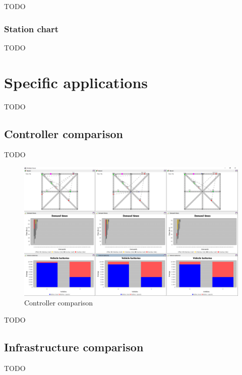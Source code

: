 \documentclass[10pt,twocolumn]{article}
\begin{document}
TODO

\subsubsection{Station chart}

TODO

\section{Specific applications}
\label{sec:application}

TODO

\subsection{Controller comparison}
\label{sec:controller-comparison}

TODO

\begin{figure}[tbp]
    \includegraphics[width=\textwidth]{../../screenshots/controller-comparison.png}
    \caption{Controller comparison}
    \label{fig:controller-comparison}
\end{figure}

TODO

\subsection{Infrastructure comparison}
\label{sec:infrastructure-comparison}

TODO
\end{document}
